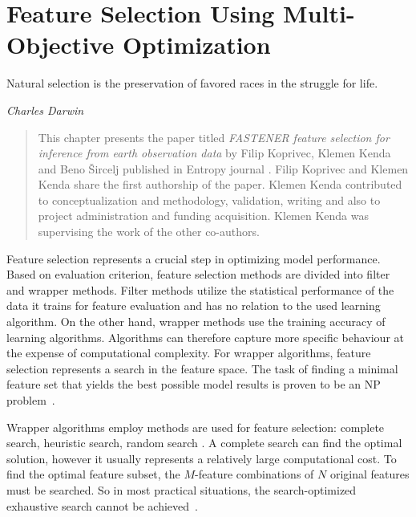 % 
\chapter{Feature Selection Using Multi-Objective Optimization}
\label{ch:feature-selection}

\epigraph{Natural selection is the preservation of favored races in the struggle for life.}{\textit{Charles Darwin}}

\begin{quote}
This chapter presents the paper titled \textit{FASTENER feature selection for inference from earth observation data} by Filip Koprivec, Klemen Kenda and Beno Šircelj published in Entropy journal \cite{koprivec:2020:fastener}.
Filip Koprivec and Klemen Kenda share the first authorship of the paper.
Klemen Kenda contributed to conceptualization and methodology, validation, writing and also to project administration and funding acquisition. 
Klemen Kenda was supervising the work of the other co-authors.
\end{quote}

Feature selection represents a crucial step in optimizing model performance.
Based on evaluation criterion, feature selection methods are divided into filter and wrapper methods.
Filter methods utilize the statistical performance of the data it trains for feature evaluation and has no relation to the used learning algorithm.
On the other hand, wrapper methods use the training accuracy of learning algorithms.
Algorithms can therefore capture more specific behaviour at the expense of computational complexity.
For wrapper algorithms, feature selection represents a search in the feature space.
The task of finding a minimal feature set that yields the best possible model results is proven to be an NP problem~\cite{hua:2009:performance}.

Wrapper algorithms employ methods are used for feature selection: complete search, heuristic search, random search \cite{jia:2022:feature}.
A complete search can find the optimal solution, however it usually represents a relatively large computational cost.
To find the optimal feature subset, the $M$-feature combinations of $N$ original features must be searched. 
So in most practical situations, the search-optimized exhaustive search cannot be achieved~\cite{jia:2022:feature}.

